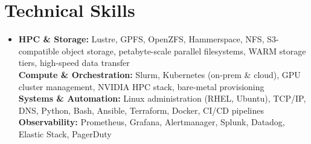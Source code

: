 \section{Technical Skills}
\begin{itemize}[leftmargin=0.15in, label={}]
  \item{
    \textbf{HPC \& Storage:} Lustre, GPFS, OpenZFS, Hammerspace, NFS, S3-compatible object storage, petabyte-scale parallel filesystems, WARM storage tiers, high-speed data transfer \\
    \textbf{Compute \& Orchestration:} Slurm, Kubernetes (on-prem \& cloud), GPU cluster management, NVIDIA HPC stack, bare-metal provisioning \\
    \textbf{Systems \& Automation:} Linux administration (RHEL, Ubuntu), TCP/IP, DNS, Python, Bash, Ansible, Terraform, Docker, CI/CD pipelines \\
    \textbf{Observability:} Prometheus, Grafana, Alertmanager, Splunk, Datadog, Elastic Stack, PagerDuty
  }
\end{itemize}
